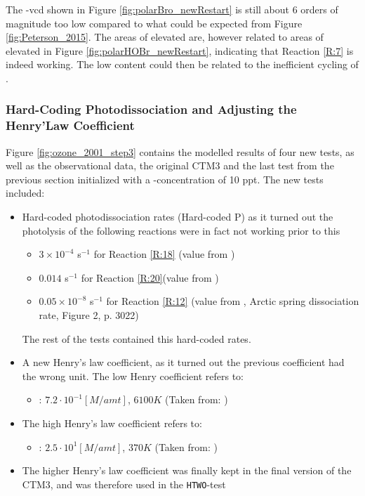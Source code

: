 \medskip

The -\acrshort{vcd} shown in Figure \ref{fig:polarBro_newRestart} is still about 6 orders of magnitude too low compared to what could be expected from Figure \ref{fig:Peterson_2015}. The areas of elevated  are, however related to areas of elevated  in Figure \ref{fig:polarHOBr_newRestart}, indicating that Reaction \ref{R:7} is indeed working. The low content could then be related to the inefficient cycling of . 


\subsubsection{Hard-Coding Photodissociation and Adjusting the Henry'Law Coefficient}\label{sec:disc_step3}

Figure \ref{fig:ozone_2001_step3} contains the modelled results of four new tests, as well as the observational data, the original CTM3 and the last test from the previous section initialized with a -concentration of 10 ppt. The new tests included: 

\begin{itemize}
    \item Hard-coded photodissociation rates (Hard-coded P) as it turned out the photolysis of the following reactions were in fact not working prior to this
    \begin{itemize}
        \item $3\times10^{-4}$ s$^{-1}$ for Reaction \ref{R:18} (value from \cite{CAO})
        \item $0.014$ s$^{-1}$ for Reaction \ref{R:20}(value from \cite{CAO})
        \item $0.05\times10^{-8}$ s$^{-1}$ for Reaction \ref{R:12} (value from \cite{Papanastasiou2013}, Arctic spring dissociation rate, Figure 2, p. 3022)
    \end{itemize}
    The rest of the tests contained this hard-coded rates. 
    \item A new Henry's law coefficient, as it turned out the previous coefficient had the wrong unit. The low Henry coefficient refers to:
    \begin{itemize}
        \item {}: $7.2\cdot 10^{-1} [M/amt]$, $6100 K$ (Taken from: \cite{Chameides1992})
    \end{itemize}   
    \item The high Henry's law coefficient refers to: 
    \begin{itemize}
        \item {}: $2.5 \cdot 10^{1} [M/amt]$, $370 K$ (Taken from: \cite{dean1999})
    \end{itemize}
    \item The higher Henry's law coefficient was finally kept in the final version of the CTM3, and was therefore used in the \texttt{HTWO}-test
\end{itemize}

